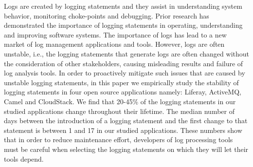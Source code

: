 Logs are created by logging statements and they	assist in understanding system behavior, monitoring choke-points and debugging. Prior research has demonstrated the importance of logging statements in operating, understanding and improving software systems. The importance of logs has lead to a new market of log management applications and tools. However, logs are often unstable, i.e., the logging statements that generate logs are often changed without the consideration of other stakeholders, causing misleading results and failure of log analysis tools. In order to proactively mitigate such issues that are caused by unstable logging statements, in this paper we empirically study the stability of logging statements in four open source applications namely: Liferay, ActiveMQ, Camel and CloudStack. We find that 20-45\% of the logging statements in our studied applications change throughout their lifetime. The median number of days between the introduction of a logging statement and the first change to that statement is between 1 and 17 in our studied applications. These numbers show that in order to reduce maintenance effort, developers of log processing tools must be careful when selecting the logging statements on which they will let their tools depend.

